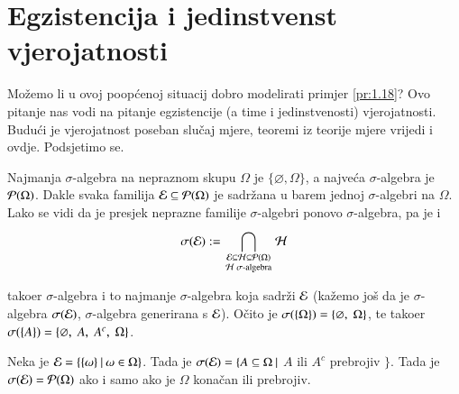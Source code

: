 
\chapter{Egzistencija i jedinstvenst vjerojatnosti}

Mo\v zemo li u ovoj poop\' cenoj situacij dobro modelirati primjer \ref{pr:1.18}?
Ovo pitanje nas vodi na pitanje egzistencije (a time i jedinstvenosti) vjerojatnosti.
Budu\' ci je vjerojatnost poseban slu\v caj mjere, teoremi iz teorije mjere vrijedi i ovdje.
Podsjetimo se.

Najmanja $\sigma$-algebra na nepraznom skupu $\Omega$ je $\{\varnothing, \Omega\}$, a najve\' ca $\sigma$-algebra je $\mathcal{P}({\Omega})$.
Dakle svaka familija $\mathcal{E} \subseteq \mathcal{P}({\Omega})$ je sadr\v zana u barem jednoj $\sigma$-algebri na $\Omega$.
Lako se vidi da je presjek neprazne familije $\sigma$-algebri ponovo $\sigma$-algebra, pa je i
\begin{equation} \label{jed:2.1}
    \sigma({\mathcal{E}}) := \bigcap\limits_{
        \begin{smallmatrix}
            \mathcal{E} \subseteq \mathcal{H} \subseteq \mathcal{P}({\Omega})\\
            \mathcal{H} \; \sigma \textnormal{-algebra}
        \end{smallmatrix}
    }^{} \mathcal{H}
\end{equation}

tako\dj er $\sigma$-algebra i to najmanje $\sigma$-algebra koja sadr\v zi $\mathcal{E}$ (ka\v zemo jo\v s da je $\sigma$-algebra $\sigma({\mathcal{E}})$, $\sigma$-algebra generirana s $\mathcal{E}$).
O\v cito je $\sigma({\{\Omega\}}) = \{ \varnothing, \; \Omega\}$,
te tako\dj er $\sigma({\{A\}}) = \{ \varnothing, \; A, \; A^c, \; \Omega \}$.

\begin{zad} \label{zad:2.2}
    Neka je $\mathcal{E} = \{{\{ \omega \}} \: | \: {\omega \in \Omega}\}$.
    Tada je $\sigma({\mathcal{E}}) =\{ A \subseteq \Omega \: |$ $A$ ili $A^c$ prebrojiv $\}$. Tada je $\sigma({\mathcal{E}}) = \mathcal{P}({\Omega})$ ako i samo ako je $\Omega$ kona\v can ili prebrojiv.
\end{zad}

